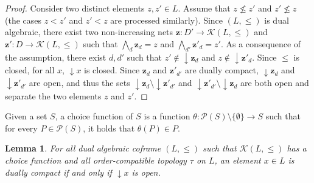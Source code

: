 \documentclass{article}
\newtheorem{lemma}[theorem]{Lemma}
\begin{document}
\begin{proof} 
    Consider two distinct elements $z,z' \in L$. Assume that $z \not \le z'$ and $z' \not \le z$ (the cases $z < z'$ and $z' < z$ are processed similarly). %
    {Since $(L,\le)$ is dual algebraic}, there exist 
    two non-increasing nets %
    {$\boldsymbol{z} : D' \rightarrow \mathcal{K}(L,\le)$} and 
    {$\boldsymbol{z}' : D \rightarrow \mathcal{K}(L,\le)$} such that %
    {$\bigwedge_d \boldsymbol{z}_d = z$} and 
    {$\bigwedge_{d'} \boldsymbol{z}'_d = z'$}. As a consequence of the assumption, there exist $d,d'$ such that $z' \notin \mathop{\downarrow}\boldsymbol{z}_d$ and $z \notin \mathop{\downarrow}\boldsymbol{z}'_d$. Since $\le$ is closed, for all $x$, $\mathop{\downarrow} x$ is closed. Since $\boldsymbol{z}_d$ and $\boldsymbol{z}'_{d'}$  are dually compact, 
    $\mathop{\downarrow}\boldsymbol{z}_d$ and $\mathop{\downarrow}\boldsymbol{z}'_{d'}$ are open, 
    and thus the sets
    $\mathop{\downarrow}\boldsymbol{z}_d \setminus \mathop{\downarrow}\boldsymbol{z}'_{d'}$ and $\mathop{\downarrow}\boldsymbol{z}'_{d'} \setminus \mathop{\downarrow}\boldsymbol{z}_d$ are both open and separate the two elements $z$ and $z'$.
\end{proof}


Given a set $S$, a choice function of $S$ is a function $\theta: \mathcal{P}(S) \setminus \{\emptyset\} \rightarrow S$ such that for every $P \in \mathcal{P}(S)$, it holds that $\theta(P) \in P$. 

\begin{lemma}\label{lemma.finite.type.included}
    {For all dual algebraic coframe $(L,\le)$ such that $\mathcal{K}(L,\le)$ has a choice function and all order-compatible topology $\tau$ on $L$, an element $x \in L$ is dually compact if and only if $\mathop{\downarrow}x$ is open.}
\end{lemma}
\end{document}
